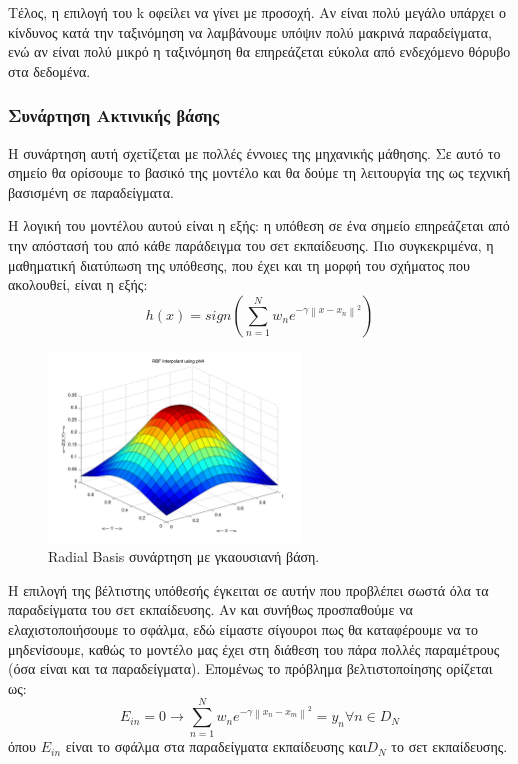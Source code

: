 \documentclass{article}
\newcommand{\norm}[1]{\left\lVert#1\right\rVert}
\begin{document}
 Τέλος, η επιλογή του k οφείλει να γίνει με προσοχή. Αν είναι πολύ μεγάλο υπάρχει ο κίνδυνος κατά την ταξινόμηση να λαμβάνουμε υπόψιν πολύ μακρινά παραδείγματα, ενώ αν είναι πολύ μικρό η ταξινόμηση θα επηρεάζεται εύκολα από ενδεχόμενο θόρυβο στα δεδομένα.
\subsubsection{Συνάρτηση Ακτινικής βάσης }
Η συνάρτηση αυτή σχετίζεται με πολλές έννοιες της μηχανικής μάθησης. Σε αυτό το σημείο θα ορίσουμε το βασικό της μοντέλο και θα δούμε τη λειτουργία της ως τεχνική βασισμένη σε παραδείγματα. 

Η λογική του  μοντέλου αυτού είναι η εξής: η υπόθεση σε ένα σημείο επηρεάζεται από την απόστασή του από κάθε παράδειγμα του σετ εκπαίδευσης. Πιο συγκεκριμένα, η μαθηματική διατύπωση της υπόθεσης, που έχει και τη μορφή του σχήματος που ακολουθεί, είναι η εξής:
$$h(x)= sign( \sum_{n=1}^{N} w_n e^{-\gamma \norm{x - x_n}^2})$$
\begin{figure}[H]
	\centering			
    \includegraphics[width=0.6\textwidth]{rbf.png}
    \caption[Radial Basis συνάρτηση με γκαουσιανή βάση]{Radial Basis συνάρτηση με γκαουσιανή βάση.}
 \end{figure}
 Η επιλογή της βέλτιστης υπόθεσής έγκειται σε αυτήν που προβλέπει σωστά όλα τα παραδείγματα του σετ εκπαίδευσης. Αν και συνήθως προσπαθούμε να ελαχιστοποιήσουμε το σφάλμα, εδώ είμαστε σίγουροι πως θα καταφέρουμε να το μηδενίσουμε, καθώς το μοντέλο μας έχει στη διάθεση του πάρα πολλές παραμέτρους (όσα είναι και τα παραδείγματα). Επομένως το πρόβλημα βελτιστοποίησης ορίζεται ως:
 $$E_{in}=0 \rightarrow  \sum_{n=1}^{N} w_n e^{-\gamma \norm{x_n - x_m}^2}= y_n  \forall n \in D_N $$
 όπου $E_{in}$ είναι το σφάλμα στα παραδείγματα εκπαίδευσης και$ D_N$ το σετ εκπαίδευσης. 
 
\end{document}
